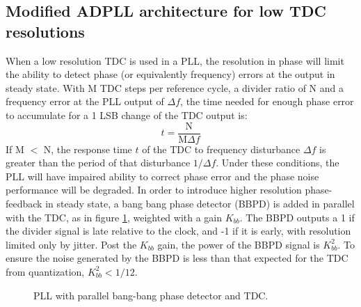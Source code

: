 \subsection{Modified ADPLL architecture for low TDC resolutions}
When a low resolution TDC is used in a PLL, the resolution in phase will limit the ability to detect phase (or equivalently frequency) errors at the output in steady state. With M TDC steps per reference cycle, a divider ratio of N and a frequency error at the PLL output of $\Delta f$, the time needed for enough phase error to accumulate for a 1 LSB change of the TDC output is:
\begin{equation}
	t = \frac{\text{N}}{\text{M}\Delta f}
\end{equation}
If M $<$ N, the response time $t$ of the TDC to frequency disturbance $\Delta f$ is greater than the period of that disturbance $1/\Delta f$. Under these conditions, the PLL will have impaired ability to correct phase error and the phase noise performance will be degraded. In order to introduce higher resolution phase-feedback in steady state, a bang bang phase detector (BBPD) is added in parallel with the TDC, as in figure \ref{fig:bbpll}, weighted with a gain $K_{bb}$. The BBPD outputs a 1 if the divider signal is late relative to the clock, and -1 if it is early, with resolution limited only by jitter. Post the $K_{bb}$ gain, the power of the BBPD signal is $K_{bb}^2$. To ensure the noise generated by the BBPD is less than that expected for the TDC from quantization, $K_{bb}^2 < 1/12$.
\vspace{-1em}
\begin{figure}[htb!]
	\center
	\caption{PLL with parallel bang-bang phase detector and TDC.}
	\label{fig:bbpll}
\end{figure}
\FloatBarrier




